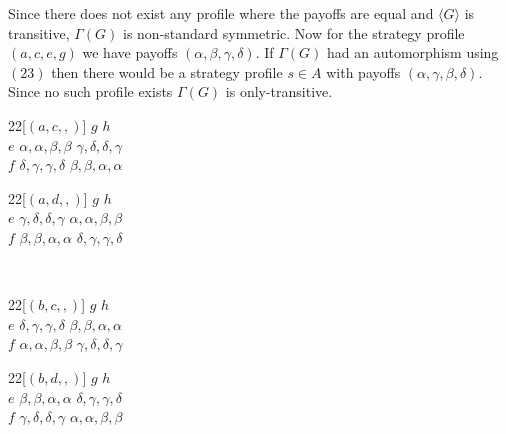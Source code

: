 \begin{example}
Since there does not exist any profile where the payoffs are equal and $\langle{G}\rangle$ is transitive, $\Gamma(G)$ is non-standard symmetric. Now for the strategy profile $(a,c,e,g)$ we have payoffs $(\alpha, \beta, \gamma, \delta)$. If $\Gamma(G)$ had an automorphism using $(23)$ then there would be a strategy profile $s \in A$ with payoffs $(\alpha, \gamma, \beta, \delta)$. Since no such profile exists $\Gamma(G)$ is only-transitive.

\begin{center}
  \begin{game}{2}{2}[$(a,c,,)$]
       \>  $g$          \>  $h$          \\
    $e$  \>  $\alpha,\alpha,\beta,\beta$  \>  $\gamma,\delta,\delta,\gamma$  \\
    $f$  \>  $\delta,\gamma,\gamma,\delta$  \>  $\beta,\beta,\alpha,\alpha$  
  \end{game}
  \hspace*{5mm}
  \begin{game}{2}{2}[$(a,d,,)$]
       \>  $g$          \>  $h$          \\
    $e$  \>  $\gamma,\delta,\delta,\gamma$  \>  $\alpha,\alpha,\beta,\beta$  \\
    $f$  \>  $\beta,\beta,\alpha,\alpha$  \>  $\delta,\gamma,\gamma,\delta$  
  \end{game}
  \\
  \begin{game}{2}{2}[$(b,c,,)$]
       \>  $g$          \>  $h$          \\
    $e$  \>  $\delta,\gamma,\gamma,\delta$  \>  $\beta,\beta,\alpha,\alpha$  \\
    $f$  \>  $\alpha,\alpha,\beta,\beta$  \>  $\gamma,\delta,\delta,\gamma$  
  \end{game}
  \hspace*{5mm}
  \begin{game}{2}{2}[$(b,d,,)$]
       \>  $g$          \>  $h$          \\
    $e$  \>  $\beta,\beta,\alpha,\alpha$  \>  $\delta,\gamma,\gamma,\delta$  \\
    $f$  \>  $\gamma,\delta,\delta,\gamma$  \>  $\alpha,\alpha,\beta,\beta$  
  \end{game}
\end{center}


\end{example}
